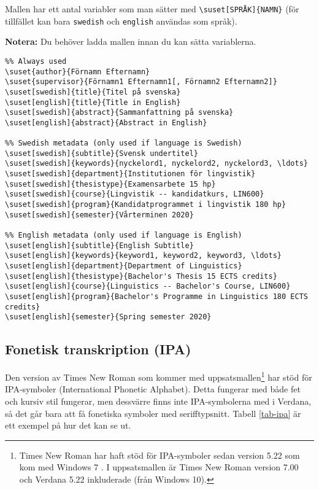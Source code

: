 Mallen har ett antal variabler som man sätter med \verb|\suset[SPRÅK]{NAMN}|
(för tillfället kan bara \texttt{swedish} och \texttt{english} användas som
språk).

\textbf{Notera:} Du behöver ladda mallen innan du kan sätta variablerna.

\begin{verbatim}
%% Always used
\suset{author}{Förnamn Efternamn}
\suset{supervisor}{Förnamn1 Efternamn1[, Förnamn2 Efternamn2]}
\suset[swedish]{title}{Titel på svenska}
\suset[english]{title}{Title in English}
\suset[swedish]{abstract}{Sammanfattning på svenska}
\suset[english]{abstract}{Abstract in English}

%% Swedish metadata (only used if language is Swedish)
\suset[swedish]{subtitle}{Svensk undertitel}
\suset[swedish]{keywords}{nyckelord1, nyckelord2, nyckelord3, \ldots}
\suset[swedish]{department}{Institutionen för lingvistik}
\suset[swedish]{thesistype}{Examensarbete 15 hp}
\suset[swedish]{course}{Lingvistik -- kandidatkurs, LIN600}
\suset[swedish]{program}{Kandidatprogrammet i lingvistik 180 hp}
\suset[swedish]{semester}{Vårterminen 2020}

%% English metadata (only used if language is English)
\suset[english]{subtitle}{English Subtitle}
\suset[english]{keywords}{keyword1, keyword2, keyword3, \ldots}
\suset[english]{department}{Department of Linguistics}
\suset[english]{thesistype}{Bachelor's Thesis 15 ECTS credits}
\suset[english]{course}{Linguistics -- Bachelor's Course, LIN600}
\suset[english]{program}{Bachelor's Programme in Linguistics 180 ECTS credits}
\suset[english]{semester}{Spring semester 2020}
\end{verbatim}


\subsection{Fonetisk transkription (IPA)}
\label{ipa}

Den version av Times New Roman som kommer med uppsatsmallen\footnote{Times New
  Roman har haft stöd för IPA-symboler sedan version 5.22 \citep{ipa} som kom
  med Windows 7 \citep{win-7-fonts}. I uppsatsmallen är Times New Roman version
  7.00 och Verdana 5.22 inkluderade (från Windows 10).} har stöd för
IPA-symboler (International Phonetic Alphabet). Detta fungerar med både fet och
kursiv stil fungerar, men dessvärre finns inte IPA-symbolerna med i Verdana, så
det går bara att få fonetiska symboler med serifftypsnitt. Tabell
\ref{tab-ipa} är ett exempel på hur det kan se ut.

